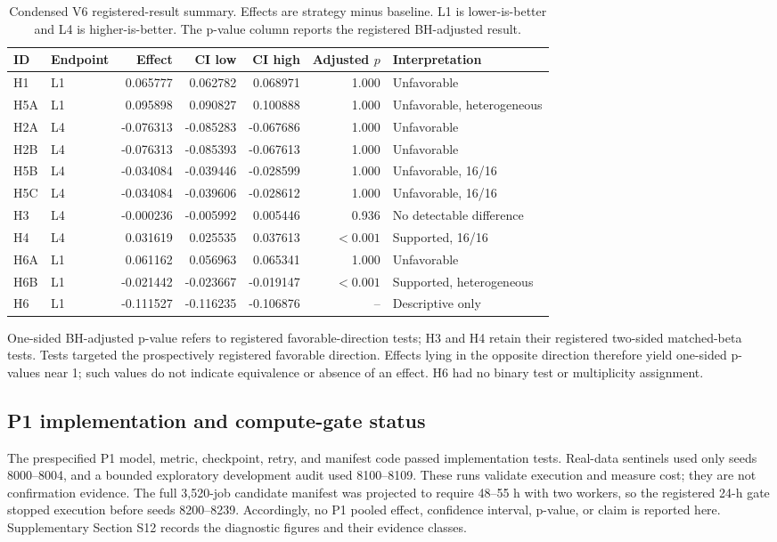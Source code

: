 \documentclass[10pt]{article}
\begin{document}
\FloatBarrier
\begin{table}[!tbp]
\centering
\caption{Condensed V6 registered-result summary. Effects are strategy minus
baseline. L1 is lower-is-better and L4 is higher-is-better. The p-value column
reports the registered BH-adjusted result.}
\label{tab:registered-summary}
\scriptsize
\begin{tabular}{llrrrrl}
\toprule
ID & Endpoint & Effect & CI low & CI high & Adjusted $p$ & Interpretation\\
\midrule
H1  & L1 &  0.065777 &  0.062782 &  0.068971 & 1.000 & Unfavorable\\
H5A & L1 &  0.095898 &  0.090827 &  0.100888 & 1.000 & Unfavorable, heterogeneous\\
H2A & L4 & -0.076313 & -0.085283 & -0.067686 & 1.000 & Unfavorable\\
H2B & L4 & -0.076313 & -0.085393 & -0.067613 & 1.000 & Unfavorable\\
H5B & L4 & -0.034084 & -0.039446 & -0.028599 & 1.000 & Unfavorable, 16/16\\
H5C & L4 & -0.034084 & -0.039606 & -0.028612 & 1.000 & Unfavorable, 16/16\\
H3  & L4 & -0.000236 & -0.005992 &  0.005446 & 0.936 & No detectable difference\\
H4  & L4 &  0.031619 &  0.025535 &  0.037613 & $<0.001$ & Supported, 16/16\\
H6A & L1 &  0.061162 &  0.056963 &  0.065341 & 1.000 & Unfavorable\\
H6B & L1 & -0.021442 & -0.023667 & -0.019147 & $<0.001$ & Supported, heterogeneous\\
H6  & L1 & -0.111527 & -0.116235 & -0.106876 & -- & Descriptive only\\
\bottomrule
\end{tabular}
\begin{minipage}{.98\linewidth}\footnotesize\smallskip
One-sided BH-adjusted p-value refers to registered favorable-direction tests;
H3 and H4 retain their registered two-sided matched-beta tests. Tests targeted
the prospectively registered favorable direction. Effects lying in the
opposite direction therefore yield one-sided p-values near 1; such values do
not indicate equivalence or absence of an effect. H6 had no binary test or
multiplicity assignment.
\end{minipage}
\end{table}

\subsection{P1 implementation and compute-gate status}
The prespecified P1 model, metric, checkpoint, retry, and manifest code passed
implementation tests. Real-data sentinels used only seeds 8000--8004, and a
bounded exploratory development audit used 8100--8109. These runs validate
execution and measure cost; they are not confirmation evidence. The full
3,520-job candidate manifest was projected to require 48--55 h with two
workers, so the registered 24-h gate stopped execution before seeds
8200--8239. Accordingly, no P1 pooled effect, confidence interval, p-value, or
claim is reported here. Supplementary Section S12 records the diagnostic
figures and their evidence classes.
\end{document}
